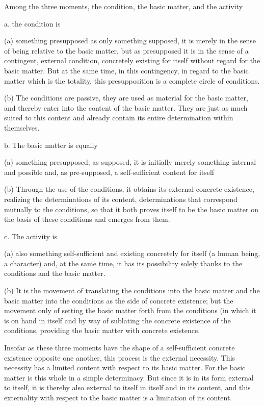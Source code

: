 Among the three moments, the condition, the basic matter, and the activity

a. the condition is

(a) something presupposed as only something supposed,
it is merely in the sense of being
relative to the basic matter,
but as presupposed it is in the sense of
a contingent, external condition,
concretely existing for itself
without regard for the basic matter.
But at the same time, in this contingency,
in regard to the basic matter which is the totality,
this presupposition is a complete circle of conditions.

(b) The conditions are passive,
they are used as material for the basic matter,
and thereby enter into the content of the basic matter.
They are just as much suited to this content
and already contain its entire determination within themselves.

b. The basic matter is equally

(a) something presupposed;
as supposed, it is initially merely something internal and possible
and, as pre-supposed, a self-sufficient content for itself

(b) Through the use of the conditions,
it obtains its external concrete existence,
realizing the determinations of its content,
determinations that correspond mutually to the conditions,
so that it both proves itself to be the basic matter
on the basis of these conditions and emerges from them.

c. The activity is

(a) also something self-sufficient and existing concretely for itself
(a human being, a character)
and, at the same time, it has its possibility
solely thanks to the conditions and the basic matter.

(b) It is the movement of translating
the conditions into the basic matter and
the basic matter into the conditions
as the side of concrete existence;
but the movement only of setting
the basic matter forth from the conditions
(in which it is on hand in itself and by way of sublating
the concrete existence of the conditions,
providing the basic matter with concrete existence.

Insofar as these three moments have the shape of a self-sufficient concrete
existence opposite one another,
this process is the external necessity.
This necessity has a limited content with respect to its basic matter.
For the basic matter is this whole in a simple determinacy.
But since it is in its form external to itself,
it is thereby also external to itself in itself and in its content,
and this externality with respect to the basic matter is
a limitation of its content.

